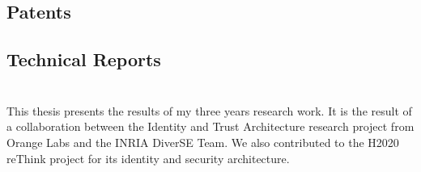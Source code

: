 \subsection*{Patents}
\begin{description}
\item \cite{corre_authent} 
\end{description}

\subsection*{Technical Reports}
\begin{description}
\item \cite{copeland_framework_2015} 

\item \cite{crom_management_2015} 

\item \cite{crom_implementation_2016} 

\item \cite{crom_implementation_2017} 

\end{description}



\section*{}
This thesis presents the results of my three years research work. 
It is the result of a collaboration between the Identity and Trust Architecture research project from Orange Labs and the INRIA DiverSE Team.
We also contributed to the H2020 reThink project for its identity and security architecture. 